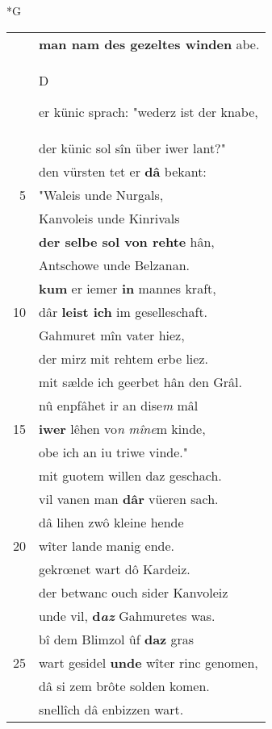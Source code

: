 \documentclass[8pt,a4paper,notitlepage]{article}
\begin{document}
\begin{table}[ht]
\begin{minipage}[t]{0.5\linewidth}
\small
\begin{center}*G
\end{center}
\begin{tabular}{rl}
 & \textbf{man nam des gezeltes winden} abe.\\ 
 & \begin{large}D\end{large}er künic sprach: "wederz ist der knabe,\\ 
 & der künic sol sîn über iwer lant?"\\ 
 & den vürsten tet er \textbf{dâ} bekant:\\ 
5 & "Waleis unde Nurgals,\\ 
 & Kanvoleis unde Kinrivals\\ 
 & \textbf{der selbe sol von rehte} hân,\\ 
 & Antschowe unde Belzanan.\\ 
 & \textbf{kum} er iemer \textbf{in} mannes kraft,\\ 
10 & dâr \textbf{leist ich} im geselleschaft.\\ 
 & Gahmuret mîn vater hiez,\\ 
 & der mirz mit rehtem erbe liez.\\ 
 & mit sælde ich geerbet hân den Grâl.\\ 
 & nû enpfâhet ir an dise\textit{m} mâl\\ 
15 & \textbf{iwer} lêhen vo\textit{n} \textit{mîne}m kinde,\\ 
 & obe ich an iu triwe vinde."\\ 
 & mit guotem willen daz geschach.\\ 
 & vil vanen man \textbf{dâr} vüeren sach.\\ 
 & dâ lihen zwô kleine hende\\ 
20 & wîter lande manig ende.\\ 
 & gekrœnet wart dô Kardeiz.\\ 
 & der betwanc ouch sider Kanvoleiz\\ 
 & unde vil, \textbf{d\textit{az}} Gahmuretes was.\\ 
 & bî dem Blimzol ûf \textbf{daz} gras\\ 
25 & wart gesidel \textbf{unde} wîter rinc genomen,\\ 
 & dâ si zem brôte solden komen.\\ 
 & snellîch dâ enbizzen wart.\\ 

\end{tabular}
\end{minipage}
\end{table}
\end{document}

